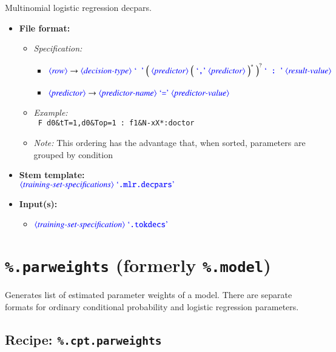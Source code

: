 \documentclass[12pt]{report}
\def\blue{\color{blue}}
\def\magenta{\color{magenta}}
\def\red{\color{red}}
\begin{document}
Multinomial logistic regression decpars.

\begin{itemize}
      \item \textbf{File format:}
      \begin{itemize}
            \item \textit{Specification:}
            \begin{itemize}
                  \item {\small $\dtype{row} \rightarrow \dtype{decision-type} \ \dcode{\ } \ \Big( \ \dtype{predictor} \ \Big( \ \dcode{,} \ \dtype{predictor} \ \Big)^* \ \Big)^? \ \dcode{\ :\ } \ \dtype{result-value}$}
                  \item {\small $\dtype{predictor} \rightarrow \dtype{predictor-name} \ \dcode{=} \ \dtype{predictor-value}$}
            \end{itemize}
            \item \textit{Example:}\\
            {\magenta\tt
            F d0\&tT=1,d0\&Top=1 : f1\&N-xX*:doctor
            }
            \item \textit{Note:} This ordering has the advantage that, when sorted, parameters are grouped by condition
      \end{itemize}
      \item \textbf{Stem template:}\\
      $\dtype{training-set-specifications}  \ \dcode{.mlr.decpars}$
      \item \textbf{Input(s):}
      \begin{itemize}
            \item $\dtype{training-set-specification} \ \dcode{.tokdecs}$
      \end{itemize}
\end{itemize}



\section{{\blue\tt \%.parweights} (formerly {\red\tt \%.model})}

Generates list of estimated parameter weights of a model. There are separate formats for ordinary conditional probability and logistic regression parameters.


\subsection{Recipe: \blue\tt \%.cpt.parweights}
\end{document}
